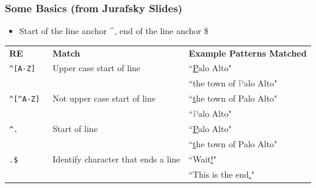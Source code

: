 \documentclass{beamer}
\begin{document}
\begin{frame}
\frametitle{Some Basics (from Jurafsky Slides) } 

\begin{itemize}
\item Start of the line anchor \alert{\^{}}, end of the line anchor \alert{\$}
\end{itemize}


\begin{center}
\scriptsize
\begin{tabular}{lll}
\textbf{RE} & \textbf{Match} & \textbf{Example Patterns Matched}\\
{\tt \alert{\^{}}[A-Z] } & Upper case start of line & ``\underline{P}alo Alto" \\
                            &                                                        & ``the town of \textcolor{gray}{P}alo Alto" \\
{\tt \alert{\^{}}[\^{}A-Z] } & Not upper case start of line &      ``\underline{t}he town of Palo Alto" \\
                            &                                                        & ``\textcolor{gray}{P}alo Alto" \\
{\tt \alert{\^{}}.} & Start of line  & ``\underline{P}alo Alto" \\
                            &                                                        & ``\underline{t}he town of Palo Alto" \\
{\tt .\alert{\$} }      & Identify character that ends a line &    ``Wait\alert{\underline{!}}" \\
                              &                                                & ``This is the end\alert{\underline{.}}" \\

 \end{tabular}
 \end{center}                   
\end{frame}
\end{document}
